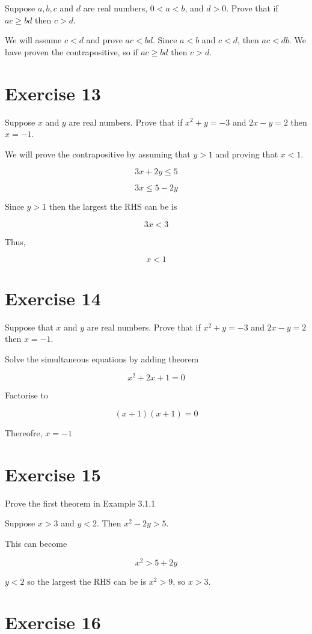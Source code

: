 \documentclass[11pt]{article}
\begin{document}
Suppose $a, b, c$ and $d$ are real numbers, $0 < a < b$, and $d > 0$. Prove 
that if $ac \geq bd$ then $c > d$.

We will assume $c < d$ and prove $ac < bd$. Since $a < b$ and $c < d$, then 
$ac < db$. We have proven the contrapositive, so if $ac \geq bd$ then $c > d$.

\section*{Exercise 13}

Suppose $x$ and $y$ are real numbers. Prove that if $x^2 + y = -3$ and 
$2x - y = 2$ then $x = -1$.

We will prove the contrapositive by assuming that $y > 1$ and proving that 
$x < 1$. 

$$3x + 2y \leq 5$$

$$3x \leq 5 - 2y$$

Since $y > 1$ then the largest the RHS can be is 

$$3x < 3$$

Thus,

$$x < 1$$

\section*{Exercise 14}

Suppose that $x$ and $y$ are real numbers. Prove that if $x^2 + y = -3$
and $2x - y = 2$ then $x = -1$.

Solve the simultaneous equations by adding theorem

$$x^2 + 2x + 1 = 0$$

Factorise to 

$$(x + 1)(x + 1) = 0$$

Thereofre, $x = -1$

\section*{Exercise 15}

Prove the first theorem in Example 3.1.1

Suppose $x > 3$ and $y < 2$. Then $x^2 - 2y > 5$.

This can become 

$$x^2 > 5 + 2y$$

$y < 2$ so the largest the RHS can be is $x^2 > 9$, so $x > 3$.

\section*{Exercise 16}
\end{document}
